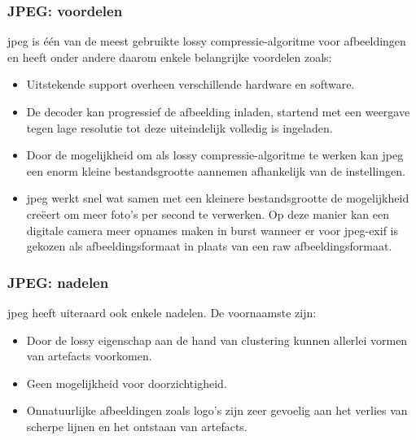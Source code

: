 \subsubsection{JPEG: voordelen}
\label{sec:afbeeldingscompressie-jpeg-voordelen}

\Gls{jpeg} is één van de meest gebruikte \gls{lossy} \gls{compressie-algoritme} voor afbeeldingen en heeft onder andere daarom enkele belangrijke voordelen zoals:

\begin{itemize}
	\item Uitstekende support overheen verschillende hardware en software.
	
	\item De  \gls{decoder} kan progressief de afbeelding inladen, startend met een weergave tegen lage resolutie tot deze uiteindelijk volledig is ingeladen.
	
	\item Door de mogelijkheid om als \gls{lossy} \gls{compressie-algoritme} te werken kan \gls{jpeg} een enorm kleine bestandsgrootte aannemen afhankelijk van de instellingen.
	
	\item \Gls{jpeg} werkt snel wat samen met een kleinere bestandsgrootte de mogelijkheid creëert om meer foto's per second te verwerken. Op deze manier kan een digitale camera meer opnames maken in burst wanneer er voor \gls{jpeg-exif} is gekozen als \gls{afbeeldingsformaat} in plaats van een \gls{raw} \gls{afbeeldingsformaat}. 
\end{itemize}

\subsubsection{JPEG: nadelen}
\label{sec:afbeeldingscompressie-jpeg-nadelen}

\Gls{jpeg} heeft uiteraard ook enkele nadelen. De voornaamste zijn:

\begin{itemize}
	\item Door de \gls{lossy} eigenschap aan de hand van clustering kunnen allerlei vormen van \glspl{artefact} voorkomen.
	
	\item Geen mogelijkheid voor doorzichtigheid.
	
	\item Onnatuurlijke afbeeldingen zoals logo's zijn zeer gevoelig aan het verlies van scherpe lijnen en het ontstaan van \glspl{artefact}.
\end{itemize}

